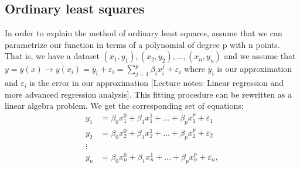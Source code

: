 \documentclass[a4paper,12pt]{article}
\begin{document}
\subsection{Ordinary least squares}
In order to explain the method of ordinary least squares, assume that we can parametrize our function in terms of a polynomial of degree p with n points. That is, we have a dataset $(x_1, y_1), (x_2, y_2),..., (x_n, y_n)$ and we assume that $y = y(x) \rightarrow y(x_i) = \tilde{y_i} + \varepsilon_i = \sum_{j=1}^p{\beta_i x_i^j} + \varepsilon_i$ where $\tilde{y_i}$ is our approximation and $\varepsilon_i$ is the error in our approximation [Lecture notes: Linear regression and more advanced regression analysis].\newline
This fitting procedure can be rewritten as a linear algebra problem. We get the corresponding set of equations: 
\begin{align*}
y_1&=\beta_0x_1^0+\beta_1x_1^1+\hdots+\beta_px_1^p+\varepsilon_1\\
y_2&=\beta_0x_2^0+\beta_1x_2^1+\hdots+\beta_px_2^p+\varepsilon_2\\
\vdots\\
y_n&=\beta_0x_n^0+\beta_1x_n^1+\hdots+\beta_px_n^p+\varepsilon_n,
\end{align*}
\end{document}
